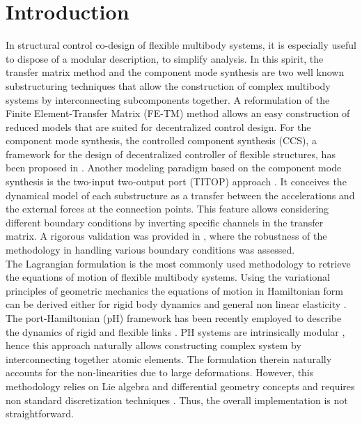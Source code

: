 \documentclass{svjour3}                     %
\newcommand{\firstRev}[1]{\textcolor{red!80!black}{#1}}
\begin{document}
\section{Introduction}
\label{intro}
\indent In structural control co-design of flexible multibody systems, it is especially useful to dispose of a modular description, to simplify analysis. In this spirit, the transfer matrix method \cite{Rui2005} and the component mode synthesis \cite{HurtyCMS} are two well known substructuring techniques that allow the construction of complex multibody systems by interconnecting subcomponents together. A reformulation of the Finite Element-Transfer Matrix (FE-TM) method \cite{TAN199047} allows an easy construction of reduced models that are suited for decentralized control design. For the component mode synthesis, the controlled component synthesis (CCS), a framework for the design of decentralized controller of flexible structures, has been proposed in \cite{YoungCMS}. Another modeling paradigm based on the component mode synthesis is the two-input two-output port (TITOP) approach \cite{TITOP}. It conceives the dynamical model of each substructure as a transfer between the accelerations and the external forces at the connection points. This feature allows considering different boundary conditions by inverting specific channels in the transfer matrix. A rigorous validation was provided in \cite{Perez,SANFEDINO2018128}, where the robustness of the methodology in handling various boundary conditions was assessed. \\
\indent The Lagrangian formulation is the most commonly used methodology to retrieve the equations of motion of flexible multibody systems. \firstRev{Using the variational principles of geometric mechanics the equations of motion in Hamiltonian form can be derived either for rigid body dynamics \cite[Proposition 7.1.1]{holm2008geometric} and general non linear elasticity \cite[Chapter 3]{marsden1981lectures}.} The port-Hamiltonian (pH) framework \cite{bookPHs} has been recently employed to describe the dynamics of rigid and flexible links \cite{macchelli_fl,macchelli_flrig}. PH systems are intrinsically modular \cite{CerveraIntFinite}, hence this approach naturally allows constructing complex system by interconnecting together atomic elements. The formulation therein naturally accounts for the non-linearities due to large deformations.  However, this methodology relies on Lie algebra and differential geometry concepts and requires non standard discretization techniques \cite{Golo}. Thus, the overall implementation is not straightforward. \\
\end{document}
